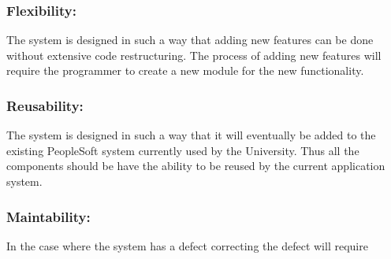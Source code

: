 \documentclass[12pt]{article}
\begin{document}
\vspace{0.1in}

\vspace{0.2in}

\subsubsection{Flexibility:}

\begin{flushleft}

The system is designed in such a way that adding new features can be done without extensive code restructuring. The process of adding new features will require the programmer to create a new module for the new functionality.

\end{flushleft}

\vspace{0.1in}

\vspace{0.2in}

\subsubsection{Reusability:}

\begin{flushleft}

The system is designed in such a way that it will eventually be added to the existing PeopleSoft system currently used by the University. Thus all the components should be have the ability to be reused by the current application system.

\end{flushleft}

\vspace{0.1in}

\vspace{0.2in}

\subsubsection{Maintability:}

\begin{flushleft}

In the case where the system has a defect correcting the defect will require

\end{flushleft}

\vspace{0.1in}
\end{document}
